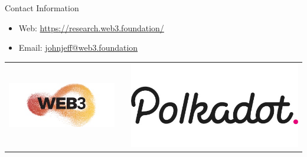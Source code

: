 \documentclass[final]{beamer}
\newlength{\onecolwid}
\begin{document}
\begin{frame}[t]
\begin{columns}[t]
\begin{column}{\onecolwid}



\begin{alertblock}{Contact Information}

\begin{itemize}
\item Web: \href{https://research.web3.foundation/}{https://research.web3.foundation/}
\item Email: \href{mailto:jeff@web3.foundation}{johnjeff@web3.foundation}
\end{itemize}

\end{alertblock}

\begin{center}
\begin{tabular}{ccc}
\includegraphics[width=0.4\linewidth]{web3-logo.jpg} & \hfill & \includegraphics[width=0.4\linewidth]{polkadot-logo-1.jpg}
\end{tabular}
\end{center}


\end{column} %

\end{columns} %

\end{frame} %
\end{document}
